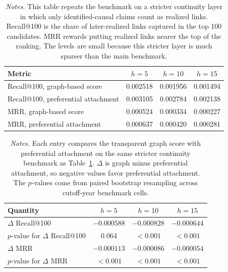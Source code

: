 \documentclass[11pt]{article}
\newcommand{\fignotes}[1]{\caption*{\textit{Notes.} #1}}
\begin{document}
\begin{table}[h]
  \caption{Continuity benchmark on the identified-causal-claim layer}
  \label{tab:strict-main-benchmark}
  \centering
  \begin{tabular}{lccc}
    \toprule
    Metric & \(h=5\) & \(h=10\) & \(h=15\) \\
    \midrule
    Recall@100, graph-based score & 0.002518 & 0.001956 & 0.001494 \\
    Recall@100, preferential attachment & 0.003105 & 0.002784 & 0.002138 \\
    MRR, graph-based score & 0.000524 & 0.000334 & 0.000227 \\
    MRR, preferential attachment & 0.000637 & 0.000420 & 0.000281 \\
    \bottomrule
  \end{tabular}
  \fignotes{This table repeats the benchmark on a stricter continuity layer in which only identified-causal claims count as realized links. Recall@100 is the share of later-realized links captured in the top 100 candidates. MRR rewards putting realized links nearer the top of the ranking. The levels are small because this stricter layer is much sparser than the main benchmark.}
\end{table}

\begin{table}[h]
  \caption{Paired bootstrap continuity comparison: graph-based score minus preferential attachment}
  \label{tab:strict-significance}
  \centering
  \begin{tabular}{lccc}
    \toprule
    Quantity & \(h=5\) & \(h=10\) & \(h=15\) \\
    \midrule
    \(\Delta\) Recall@100 & $-0.000588$ & $-0.000828$ & $-0.000644$ \\
    \(p\)-value for \(\Delta\) Recall@100 & 0.064 & $<0.001$ & $<0.001$ \\
    \(\Delta\) MRR & $-0.000113$ & $-0.000086$ & $-0.000054$ \\
    \(p\)-value for \(\Delta\) MRR & $<0.001$ & $<0.001$ & $<0.001$ \\
    \bottomrule
  \end{tabular}
  \fignotes{Each entry compares the transparent graph score with preferential attachment on the same stricter continuity benchmark as Table~\ref{tab:strict-main-benchmark}. \(\Delta\) is graph minus preferential attachment, so negative values favor preferential attachment. The \(p\)-values come from paired bootstrap resampling across cutoff-year benchmark cells.}
\end{table}
\end{document}
